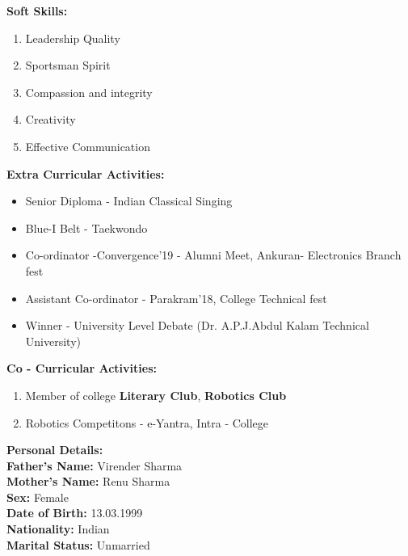 \documentclass {article}
\begin{document}
\begin {flushleft} \Large \textbf{ Soft Skills:} \end{flushleft}
	\begin {enumerate}
		\item Leadership Quality
		\item Sportsman Spirit
		\item Compassion and integrity
		\item Creativity
		\item Effective Communication
	\end {enumerate}
\begin {flushleft} \Large \textbf{ Extra Curricular Activities:} \end{flushleft}
	\begin {itemize}
		\item Senior Diploma - Indian Classical Singing
		\item Blue-I Belt - Taekwondo
		\item Co-ordinator -Convergence'19 - Alumni Meet, Ankuran- Electronics Branch fest
		\item Assistant Co-ordinator - Parakram'18, College Technical fest 
		\item Winner - University Level Debate (Dr. A.P.J.Abdul Kalam Technical University)
	\end {itemize}
\begin {flushleft} \Large \textbf {Co - Curricular Activities:} \end{flushleft}
	\begin {enumerate}
		\item Member of college \textbf{Literary Club}, \textbf{Robotics Club}
		\item Robotics Competitons - e-Yantra, Intra - College		 
	\end {enumerate}
\begin {flushleft}  \Large \textbf {Personal Details: }\\ \large \textbf {Father's Name:} Virender Sharma\\ 
 \textbf {Mother's Name: }Renu Sharma \\ 
\textbf {Sex:} Female \\ 
\textbf {Date of Birth:} 13.03.1999\\ 
\textbf {Nationality:} Indian\\ 
\textbf {Marital Status:} Unmarried\\
\end {flushleft}
\newpage 
\end{document}
